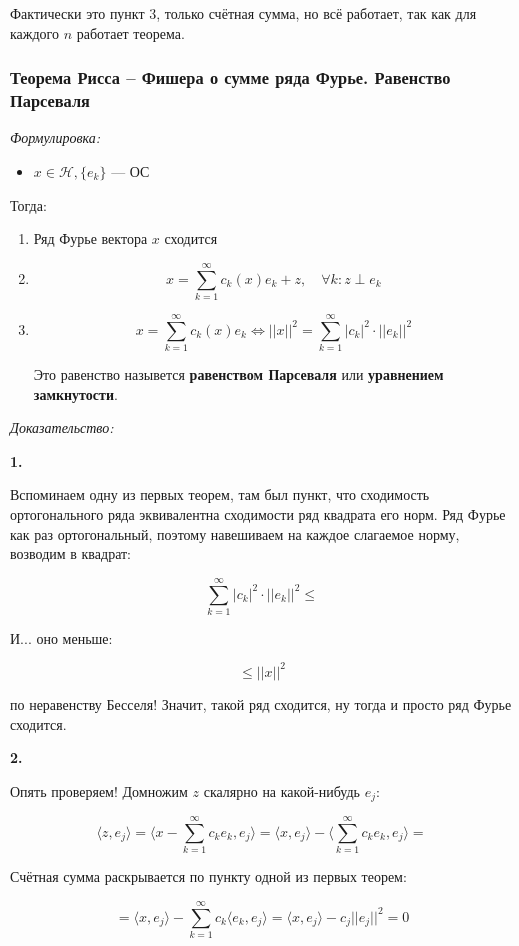 \documentclass{article}
\def\sk#1#2{\langle #1, #2 \rangle}
\begin{document}
Фактически это пункт 3, только счётная сумма, но всё работает, так как для каждого $n$ работает теорема.

\subsubsection{Теорема Рисса -- Фишера о сумме ряда Фурье. Равенство Парсеваля}
\textit{Формулировка:}

\begin{itemize}
    \item $x \in \mathcal{H}, \{e_k\}$ --- ОС
\end{itemize}

Тогда:

\begin{enumerate}
    \item Ряд Фурье вектора $x$ сходится
    \item \[x = \sum_{k = 1}^{\infty} c_k(x)e_k + z, \quad \forall k: z \perp e_k\]
    \item \[x = \sum_{k = 1}^{\infty} c_k(x)e_k \Leftrightarrow ||x||^2 = \sum_{k = 1}^{\infty} |c_k|^2 \cdot ||e_k||^2\]
    
    Это равенство назывется \textbf{равенством Парсеваля} или \textbf{уравнением замкнутости}.
\end{enumerate}

\textit{Доказательство:}

\textbf{1.}

Вспоминаем одну из первых теорем, там был пункт, что сходимость ортогонального ряда эквивалентна сходимости ряд квадрата его норм. Ряд Фурье как раз ортогональный, поэтому навешиваем на каждое слагаемое норму, возводим в квадрат:

\[\sum_{k = 1}^{\infty} |c_k|^2 \cdot ||e_k||^2 \le\]

И... оно меньше:

\[\le ||x||^2\] 

по неравенству Бесселя! Значит, такой ряд сходится, ну тогда и просто ряд Фурье сходится.

\textbf{2.}

Опять проверяем! Домножим $z$ скалярно на какой-нибудь $e_j$:

\[\sk{z}{e_j} = \sk{x - \sum_{k = 1}^{\infty} c_k e_k}{e_j} = \sk{x}{e_j} - \sk{\sum_{k = 1}^{\infty} c_k e_k}{e_j} =\]

Счётная сумма раскрывается по пункту одной из первых теорем:

\[= \sk{x}{e_j} - \sum_{k = 1}^{\infty} c_k \sk{e_k}{e_j} = \sk{x}{e_j} - c_j ||e_j||^2 = 0\]
\end{document}
